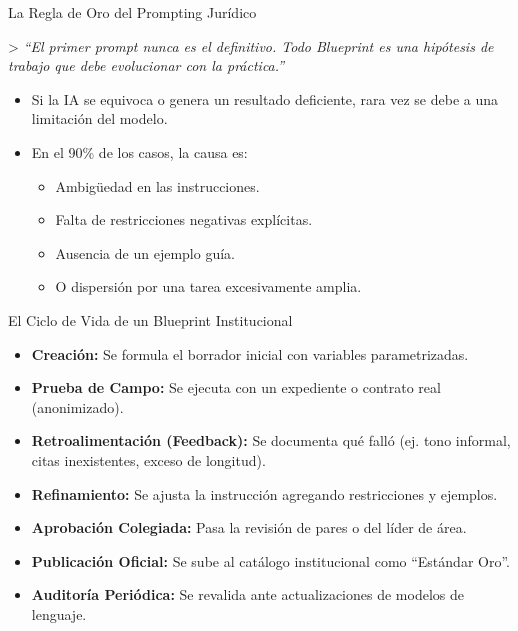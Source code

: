 \documentclass[aspectratio=169]{beamer}
\begin{document}
\begin{frame}{La Regla de Oro del Prompting Jurídico}

> \textit{``El primer prompt nunca es el definitivo. Todo Blueprint es una hipótesis de trabajo que debe evolucionar con la práctica.''}

\begin{itemize}
  \item Si la IA se equivoca o genera un resultado deficiente, rara vez se debe a una limitación del modelo.
  \item En el 90\% de los casos, la causa es:
  \begin{itemize}
    \item Ambigüedad en las instrucciones.
    \item Falta de restricciones negativas explícitas.
    \item Ausencia de un ejemplo guía.
    \item O dispersión por una tarea excesivamente amplia.
  \end{itemize}
\end{itemize}
\end{frame}

\begin{frame}{El Ciclo de Vida de un Blueprint Institucional}

\begin{itemize}
  \item \textbf{Creación:} Se formula el borrador inicial con variables parametrizadas.
  \item \textbf{Prueba de Campo:} Se ejecuta con un expediente o contrato real (anonimizado).
  \item \textbf{Retroalimentación (Feedback):} Se documenta qué falló (ej. tono informal, citas inexistentes, exceso de longitud).
  \item \textbf{Refinamiento:} Se ajusta la instrucción agregando restricciones y ejemplos.
  \item \textbf{Aprobación Colegiada:} Pasa la revisión de pares o del líder de área.
  \item \textbf{Publicación Oficial:} Se sube al catálogo institucional como ``Estándar Oro''.
  \item \textbf{Auditoría Periódica:} Se revalida ante actualizaciones de modelos de lenguaje.
\end{itemize}
\end{frame}
\end{document}
